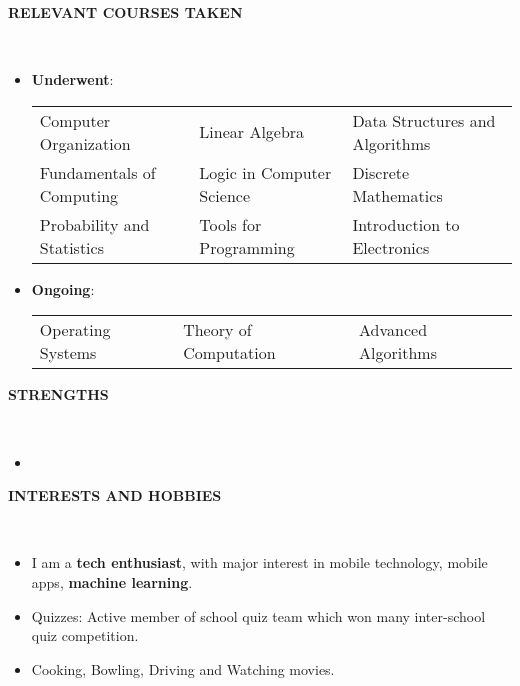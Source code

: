 \documentclass[a4paper,10pt]{article}
\newcommand{\isep}{-2 pt}
\newcommand{\lsep}{-0.5cm}
\newcommand{\resheading}[1]{{\small \colorbox{mygrey}{\begin{minipage}{0.975\textwidth}{\textbf{#1 \vphantom{p\^{E}}}}\end{minipage}}}}
\begin{document}
\resheading{\textbf{RELEVANT COURSES TAKEN} }\\[\lsep]
\begin{itemize}
\item \textbf{Underwent}:
\begin{tabular}{ L{6cm} L{6cm} L{6cm} }
Computer Organization & Linear Algebra & Data Structures and Algorithms\\
Fundamentals of Computing & Logic in Computer Science & Discrete Mathematics\\
Probability and Statistics & Tools for Programming & Introduction to Electronics
\end{tabular}

\item \textbf{Ongoing}:
\begin{tabular}{ L{6cm} L{6cm} L{6cm} }
Operating Systems & Theory of Computation & Advanced Algorithms\\
\end{tabular}
\end{itemize}

\resheading{\textbf{STRENGTHS} }\\[\lsep]
\begin{itemize}
\item \noindent 
\end{itemize}

\resheading{\textbf{INTERESTS AND HOBBIES} }\\[\lsep]
\begin{itemize}\itemsep\isep
\item \noindent I am a \textbf{tech enthusiast}, with major interest in mobile technology, mobile apps, \textbf{machine learning}.
\item \noindent Quizzes: Active member of school quiz team which won many inter-school quiz competition.
\item \noindent Cooking, Bowling, Driving and Watching movies.
\end{itemize}
\end{document}

